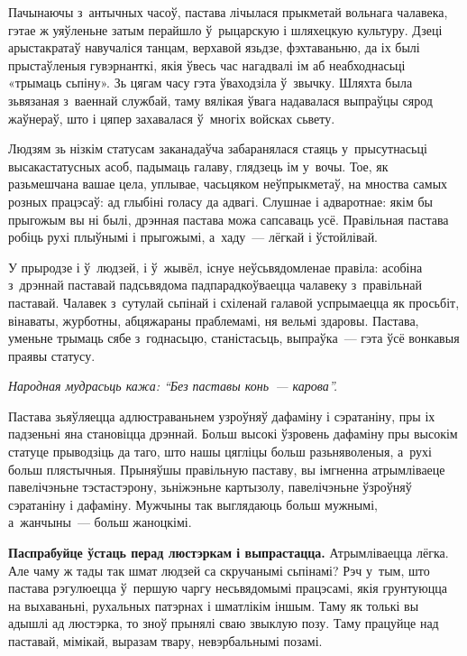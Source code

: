 
Пачынаючы з~антычных часоў, пастава лічылася прыкметай вольнага чалавека, гэтае ж уяўленьне затым перайшло ў~рыцарскую і шляхецкую культуру. Дзеці арыстакратаў навучаліся танцам, верхавой язьдзе, фэхтаваньню, да іх былі прыстаўленыя гувэрнанткі, якія ўвесь час нагадвалі ім аб неабходнасьці «трымаць сьпіну». Зь цягам часу гэта ўваходзіла ў~звычку. Шляхта была зьвязаная з~ваеннай службай, таму вялікая ўвага надавалася выпраўцы сярод жаўнераў, што і цяпер захавалася ў~многіх войсках сьвету.

Людзям зь нізкім статусам заканадаўча забаранялася стаяць у~прысутнасьці высакастатусных асоб, падымаць галаву, глядзець ім у~вочы. Тое, як разьмешчана вашае цела, уплывае, часьцяком неўпрыкметаў, на мноства самых розных працэсаў: ад глыбіні голасу да адвагі. Слушнае і адваротнае: якім бы прыгожым вы ні былі, дрэнная пастава можа сапсаваць усё. Правільная пастава робіць рухі плыўнымі і прыгожымі, а~хаду~--- лёгкай і ўстойлівай.

У прыродзе і ў~людзей, і ў~жывёл, існуе неўсьвядомленае правіла: асобіна з~дрэннай паставай падсьвядома падпарадкоўваецца чалавеку з~правільнай паставай. Чалавек з~сутулай сьпінай і схіленай галавой успрымаецца як просьбіт, вінаваты, журботны, абцяжараны праблемамі, ня вельмі здаровы. Пастава, уменьне трымаць сябе з~годнасьцю, станістасьць, выпраўка~--- гэта ўсё вонкавыя праявы статусу.

\emph{Народная мудрасьць кажа: ``Без паставы конь~--- карова''.}

Пастава зьяўляецца адлюстраваньнем узроўняў дафаміну і сэратаніну, пры іх падзеньні яна становіцца дрэннай. Больш высокі ўзровень дафаміну пры высокім статуце прыводзіць да таго, што нашы цягліцы больш разьняволеныя, а~рухі больш плястычныя. Прыняўшы правільную паставу, вы імгненна атрымліваеце павелічэньне тэстастэрону, зьніжэньне картызолу, павелічэньне ўзроўняў сэратаніну і дафаміну. Мужчыны так выглядаюць больш мужнымі, а~жанчыны~--- больш жаноцкімі.

\textbf{Паспрабуйце ўстаць перад люстэркам і выпрастацца.} Атрымліваецца лёгка. Але чаму ж тады так шмат людзей са скручанымі сьпінамі? Рэч у~тым, што пастава рэгулюецца ў~першую чаргу несьвядомымі працэсамі, якія грунтуюцца на выхаваньні, рухальных патэрнах і шматлікім іншым. Таму як толькі вы адышлі ад люстэрка, то зноў прынялі сваю звыклую позу. Таму працуйце над паставай, мімікай, выразам твару, невэрбальнымі позамі.

